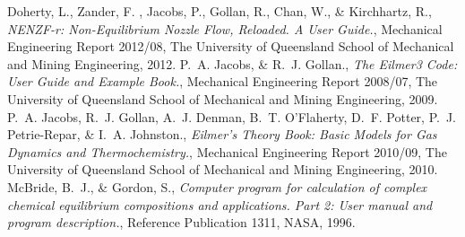\documentclass{AIAA}
\begin{document}
\begin{thebibliography}{}
Doherty, L., Zander, F. , Jacobs, P., Gollan, R., Chan, W., \& Kirchhartz, R., {\it NENZF-r: Non-Equilibrium Nozzle Flow, Reloaded. A User Guide.}, Mechanical Engineering Report 2012/08, The University of Queensland School of Mechanical and Mining Engineering, 2012.
P.~A. Jacobs, \& R.~J. Gollan., {\it The Eilmer3 Code: User Guide and Example Book.}, Mechanical Engineering Report 2008/07, The University of Queensland School of Mechanical and Mining Engineering, 2009.
P.~A. Jacobs, R.~J. Gollan, A.~J. Denman, B.~T. O'Flaherty, D.~F. Potter, P.~J. Petrie-Repar, \& I.~A. Johnston., {\it Eilmer's Theory Book: Basic Models for Gas Dynamics and Thermochemistry.}, Mechanical Engineering Report 2010/09, The University of Queensland School of Mechanical and Mining Engineering, 2010.
McBride, B.~J., \& Gordon, S., {\it Computer program for calculation of complex chemical equilibrium	compositions and applications. Part 2: User manual and program description.}, Reference Publication 1311, NASA, 1996.


\end{thebibliography}
\end{document}
